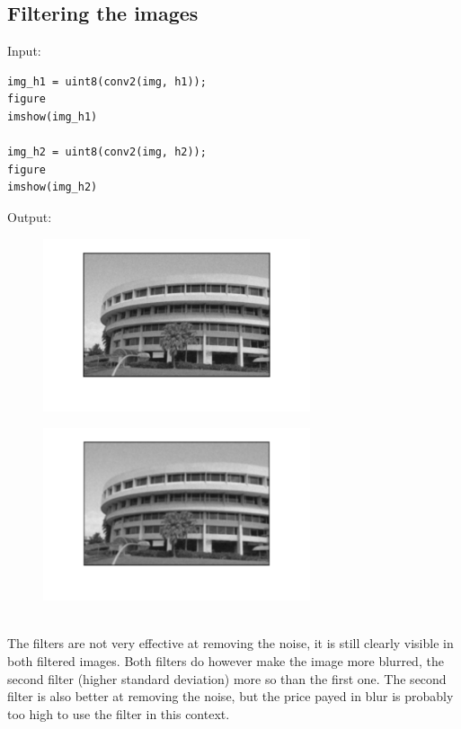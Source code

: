 \documentclass[12pt, a4paper]{article}
\begin{document}
\subsection{Filtering the images}
Input:
\begin{verbatim}
img_h1 = uint8(conv2(img, h1));
figure
imshow(img_h1)

img_h2 = uint8(conv2(img, h2));
figure
imshow(img_h2)
\end{verbatim}
Output:
\begin{figure}[H]
    \centering
    \includegraphics[width=0.7\textwidth]{fig12.png}
\end{figure}
\begin{figure}[H]
    \centering
    \includegraphics[width=0.7\textwidth]{fig13.png}
\end{figure}
~\\
The filters are not very effective at removing the noise, it is still clearly visible in both filtered images. Both filters do however make the image more blurred, the second filter (higher standard deviation) more so than the first one. The second filter is also better at removing the noise, but the price payed in blur is probably too high to use the filter in this context.
\end{document}
